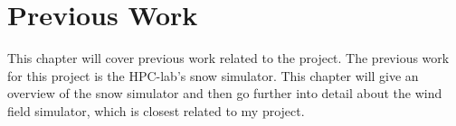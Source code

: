 \chapter{Previous Work}

This chapter will cover previous work related to the project. The previous work for 
this project is the HPC-lab's snow simulator. This chapter will give an overview 
of the snow simulator and then go further into detail about the wind field simulator, 
which is closest related to my project. 


